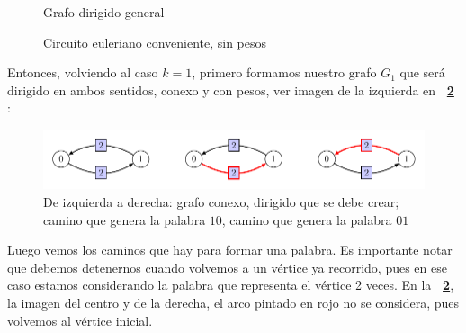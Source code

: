 \documentclass[letterpaper,10pt,table, dvipsnames]{article}
\newcommand{\figref}[1]{\figurename~\ref{#1}}
\begin{document}
\begin{figure}[h]
\centering
\begin{minipage}[b]{0.4\linewidth}
\centering
{}
\caption{Grafo dirigido general}\label{fig:dirig_total}
\end{minipage}
\hspace{3cm} %
\begin{minipage}[b]{0.4\linewidth}
\centering
{}
\caption{Circuito euleriano conveniente, sin pesos}\label{fig:camino_util}
\end{minipage}
\end{figure}

Entonces, volviendo al caso $k=1$, primero formamos nuestro grafo $G_1$ que será dirigido en ambos sentidos, conexo y con pesos, ver imagen de la izquierda en \textbf{\figref{fig:ej1}} :

\begin{figure}[h]
  \centering
  \includegraphics[scale=1]{pictures/t3/g_tam1.pdf}
  \caption{De izquierda a derecha: grafo conexo, dirigido que se debe crear; camino que genera la palabra $10$, camino que genera la palabra $01$} 
  \label{fig:ej1}
\end{figure}

Luego vemos los caminos que hay para formar una palabra. Es importante notar que debemos detenernos cuando volvemos a un vértice ya recorrido, pues en ese caso estamos considerando la palabra que representa el vértice 2 veces. En la \textbf{\figref{fig:ej1}}, la imagen del centro y de la derecha, el arco pintado en rojo no se considera, pues volvemos al vértice inicial.\\
\end{document}
